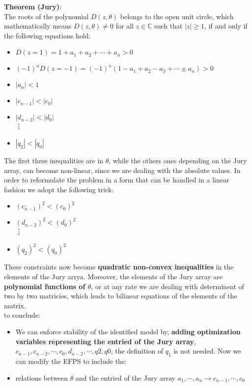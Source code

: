 \begin{enumerate}
    \textbf{Theorem (Jury)}:\\
    The roots of the polynomial $D(z,\theta)$ belongs to the open unit circle, which mathematically means \( D(z, \theta) \neq 0 \)   for all \( z \in \mathbb{C} \) such that \( |z| \geq 1 \), if and only if the following equations hold:
    \begin{itemize}
        \item\(
    D(z=1) = 1 + a_1 + a_2 + \cdots + a_n > 0
    \) 
        \item \((-1)^n D(z=-1) = (-1)^n (1 - a_1 + a_2 - a_3 + \cdots \pm a_n) >0\) 
        \item \(|a_n|<1 \)
        \item \(|c_{n-1}|< |c_0| \)
        \item \(|d_{n-2}| < |d_0|\)\\
        \vdots
        \item \(|q_2| < |q_0|\)
    \end{itemize}
    The first three inequalities are in $\theta$, while the others ones depending on the Jury array, can become non-linear, since we are dealing with the absolute values. In order to reformulate the problem in a form that can be handled in a linear fashion we adopt the following trick.
      \begin{itemize}
        \item \((c_{n-1})^2< (c_0)^2 \)
        \item \((d_{n-2})^2 < (d_0)^2\)\\
        \vdots
        \item \((q_2)^2 < (q_0)^2\)
    \end{itemize}
    These constraints now become \textbf{quadratic non-convex inequalities} in the elements of the Jury arrya. Moreover, the elements of the Jury array are \textbf{polynomial functions of $\theta$}, or at any rate we are dealing with determinent of two by two matricies, which leads to bilinear equations of the elements of the matrix.\\
    to conclude:
    \begin{itemize}
    \item We can enforce stability of the identified model by, \textbf{adding optimization variables representing the entried of the Jury array}, $c_{n-1},c_{n-2},\cdots,c_0,d_{n-2},\cdots,q2,q0 $, the definition of $q_1$ is not needed. Now we can modify the EFPS to include the:
     \item relations between $\theta$ and the entried of the Jury array \(a_1,\cdots,a_n \rightarrow c_{n-1},\cdots,c_0\)\\

\end{itemize}
\end{enumerate}
